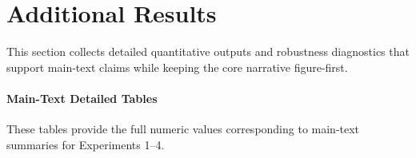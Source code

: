\documentclass[11pt]{article}
\begin{document}
\renewcommand{\thesection}{A.\arabic{section}}
\section{Additional Results}
\label{sec:extra-results}
This section collects detailed quantitative outputs and robustness diagnostics that support main-text claims while keeping the core narrative figure-first.

\paragraph{Main-Text Detailed Tables}
These tables provide the full numeric values corresponding to main-text summaries for Experiments 1--4.
\begin{table}[t]
\centering
\tiny

\caption{Exp.\ 1 metrics with 95\% bootstrap CIs (2000 resamples), embedding representation. Several intervals include zero in centered units; non-zero mismatch remains visible in the aggregate pattern.}
\label{tab:exp1-results}
\end{table}

\begin{table}[t]
\centering
\tiny

\caption{Exp.\ 1 metrics with 95\% bootstrap CIs (2000 resamples), contextual representation. Axis intervals are wide in some pairs and can cross zero, while aggregate contextual mismatch remains elevated.}
\label{tab:exp1-results-ctx}
\end{table}

\begin{table}[t]
\centering
\scriptsize
\resizebox{\columnwidth}{!}{}
\caption{Negative-control aggregate summary used as a lexical-stability reference. In this aggregate view, disagreement is comparable to or higher than the cultural-probe summary, limiting cultural-specific interpretation from aggregate metrics alone.}
\label{tab:exp1-negctrl}
\end{table}

\begin{table}[t]
\centering
\scriptsize
\resizebox{\columnwidth}{!}{}
\caption{Comparable Procrustes residuals across pairs rule out alignment failure as an explanation.}
\label{tab:exp1-procrustes}
\end{table}

\begin{table}[t]
\centering
\scriptsize
\resizebox{\columnwidth}{!}{}
\caption{Overlap ablation deltas per metric.}
\label{tab:exp2-overlap}
\end{table}
\end{document}
